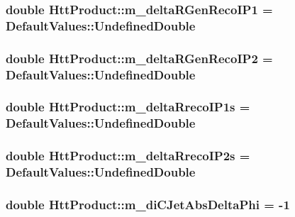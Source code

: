 \label{classHttProduct_a5bc17e1dd51ff83408e8cd70fc7b4d2d}
\hypertarget{classHttProduct_a74cf87b5a1e3860aea33859f66bfd15b}{
\subsubsection[{m\_\-deltaRGenRecoIP1}]{\setlength{\rightskip}{0pt plus 5cm}double {\bf HttProduct::m\_\-deltaRGenRecoIP1} = DefaultValues::UndefinedDouble}}
\label{classHttProduct_a74cf87b5a1e3860aea33859f66bfd15b}
\hypertarget{classHttProduct_afb7a0e37e07af8fba505256a0ff722ac}{
\subsubsection[{m\_\-deltaRGenRecoIP2}]{\setlength{\rightskip}{0pt plus 5cm}double {\bf HttProduct::m\_\-deltaRGenRecoIP2} = DefaultValues::UndefinedDouble}}
\label{classHttProduct_afb7a0e37e07af8fba505256a0ff722ac}
\hypertarget{classHttProduct_a6b60262540f218d140d75aae2c052796}{
\subsubsection[{m\_\-deltaRrecoIP1s}]{\setlength{\rightskip}{0pt plus 5cm}double {\bf HttProduct::m\_\-deltaRrecoIP1s} = DefaultValues::UndefinedDouble}}
\label{classHttProduct_a6b60262540f218d140d75aae2c052796}
\hypertarget{classHttProduct_a2bf06664258fe38b2b7ee4c163e4ff7d}{
\subsubsection[{m\_\-deltaRrecoIP2s}]{\setlength{\rightskip}{0pt plus 5cm}double {\bf HttProduct::m\_\-deltaRrecoIP2s} = DefaultValues::UndefinedDouble}}
\label{classHttProduct_a2bf06664258fe38b2b7ee4c163e4ff7d}
\hypertarget{classHttProduct_ade6a2753273f1bcf7dba3ffbc843e0b0}{
\subsubsection[{m\_\-diCJetAbsDeltaPhi}]{\setlength{\rightskip}{0pt plus 5cm}double {\bf HttProduct::m\_\-diCJetAbsDeltaPhi} = -\/1}}

